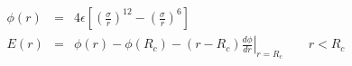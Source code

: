\documentclass[12pt]{article}
\begin{document}
\begin{eqnarray*}
\phi\left(r\right) & = & 4 \epsilon \left[ \left(\frac{\sigma}{r}\right)^{12} - 
                       \left(\frac{\sigma}{r}\right)^6 \right] \\
E\left(r\right) & = & \phi\left(r\right)  - \phi\left(R_c\right) - \left(r - R_c\right) \left.\frac{d\phi}{d r} \right|_{r=R_c}       \qquad r < R_c 
\end{eqnarray*}                           
\end{document}

